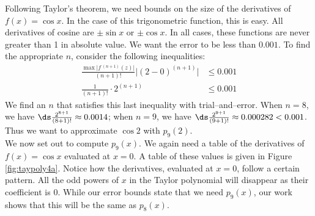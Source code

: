 {Following Taylor's theorem, we need bounds on the size of the derivatives of $f(x)=\cos x$. In the case of this trigonometric function, this is easy. All derivatives of cosine are $\pm \sin x$ or $\pm \cos x$. In all cases, these functions are never greater than 1 in absolute value. We want the error to be less than $0.001$. To find the appropriate $n$, consider the following inequalities:
\begin{align*}
\frac{\max\big|f\,^{(n+1)}(z)\big|}{(n+1)!}\big|(2-0)^{(n+1)}\big| &\leq 0.001 \\
\frac1{(n+1)!}\cdot2^{(n+1)} &\leq 0.001
\end{align*}
We find an $n$ that satisfies this last inequality with trial--and--error. When $n=8$, we have $\ds \frac{2^{8+1}}{(8+1)!} \approx 0.0014$; when $n=9$, we have $\ds \frac{2^{9+1}}{(9+1)!} \approx 0.000282 <0.001$. Thus we want to approximate $\cos 2$ with $p_9(2)$.\\

We now set out to compute $p_9(x)$. We again need a table of the derivatives of $f(x)=\cos x$ evaluated at $x=0$. A table of these values is given in Figure \ref{fig:taypoly4a}.
Notice how the derivatives, evaluated at $x=0$, follow a certain pattern. All the odd powers of $x$ in the Taylor polynomial will disappear as their coefficient is 0. While our error bounds state that we need $p_9(x)$, our work shows that this will be the same as $p_8(x)$. 

}
